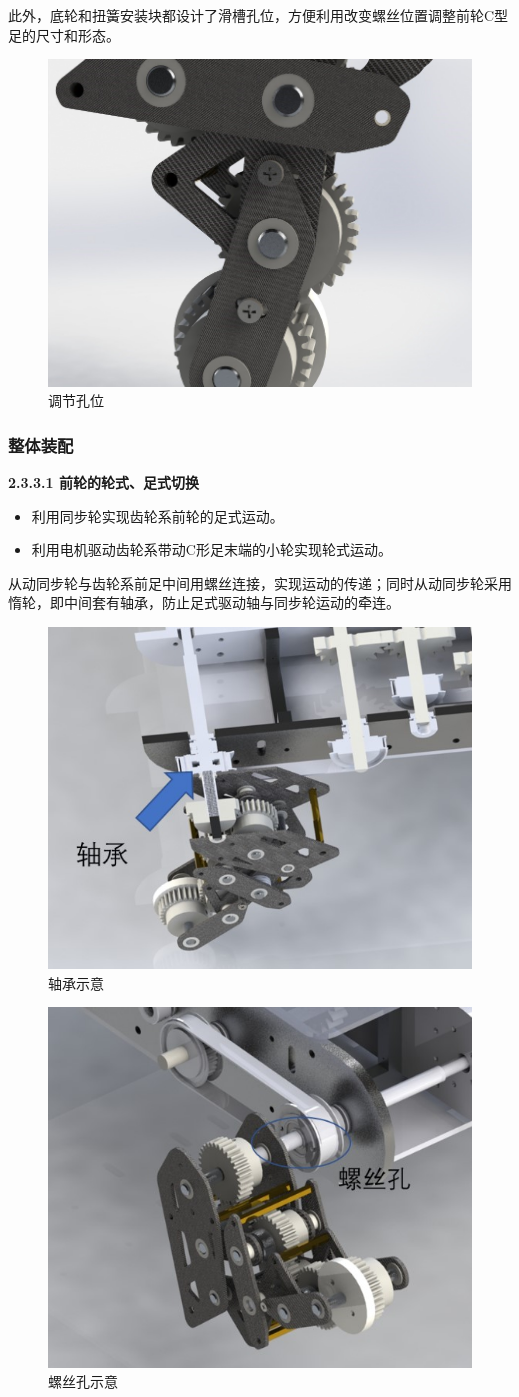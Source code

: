 \documentclass[12pt]{article}
\begin{document}
\begin{CJK}{UTF8}{gbsn}
此外，底轮和扭簧安装块都设计了滑槽孔位，方便利用改变螺丝位置调整前轮C型足的尺寸和形态。
 \begin{figure}[H]
\centering
\includegraphics[width=.6\textwidth]{chap2//figk.jpg}
\caption{调节孔位}
\end{figure}
\subsubsection{整体装配}
\textbf{2.3.3.1	前轮的轮式、足式切换}\par
\begin{itemize}
\item 利用同步轮实现齿轮系前轮的足式运动。
\item 利用电机驱动齿轮系带动C形足末端的小轮实现轮式运动。
\end{itemize}
从动同步轮与齿轮系前足中间用螺丝连接，实现运动的传递；同时从动同步轮采用惰轮，即中间套有轴承，防止足式驱动轴与同步轮运动的牵连。
 \begin{figure}[H]
\centering
\includegraphics[width=.6\textwidth]{chap2//fig21.jpg}
\caption{轴承示意}
\end{figure}
 \begin{figure}[H]
\centering
\includegraphics[width=.6\textwidth]{chap2//fig22.jpg}
\caption{螺丝孔示意}
\end{figure}


\end{CJK}
\end{document}
